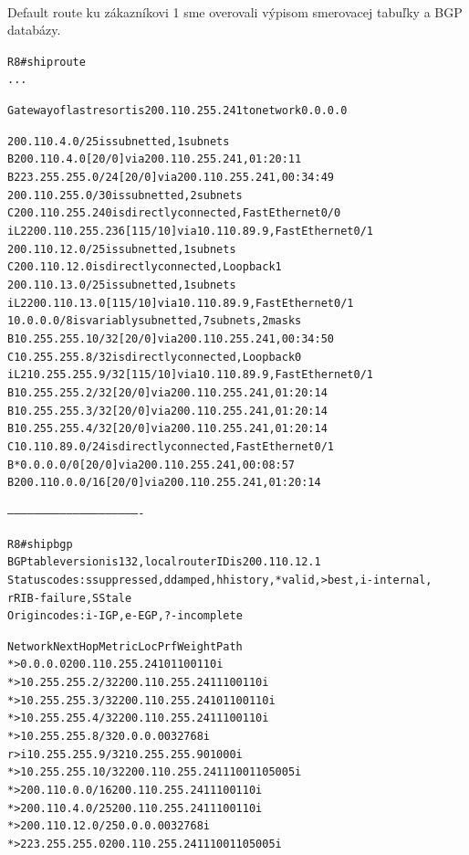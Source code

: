 \documentclass[12pt,twoside,a4paper]{report}
\begin{document}
\paragraph{}
Default route ku zákazníkovi 1 sme overovali výpisom smerovacej tabuľky a BGP databázy.

\noindent
{\selectfont
\begin{small}
\begin{alltt}
R8#sh ip route
...

Gateway of last resort is 200.110.255.241 to network 0.0.0.0

     200.110.4.0/25 is subnetted, 1 subnets
B       200.110.4.0 [20/0] via 200.110.255.241, 01:20:11
B    223.255.255.0/24 [20/0] via 200.110.255.241, 00:34:49
     200.110.255.0/30 is subnetted, 2 subnets
C       200.110.255.240 is directly connected, FastEthernet0/0
i L2    200.110.255.236 [115/10] via 10.110.89.9, FastEthernet0/1
     200.110.12.0/25 is subnetted, 1 subnets
C       200.110.12.0 is directly connected, Loopback1
     200.110.13.0/25 is subnetted, 1 subnets
i L2    200.110.13.0 [115/10] via 10.110.89.9, FastEthernet0/1
     10.0.0.0/8 is variably subnetted, 7 subnets, 2 masks
B       10.255.255.10/32 [20/0] via 200.110.255.241, 00:34:50
C       10.255.255.8/32 is directly connected, Loopback0
i L2    10.255.255.9/32 [115/10] via 10.110.89.9, FastEthernet0/1
B       10.255.255.2/32 [20/0] via 200.110.255.241, 01:20:14
B       10.255.255.3/32 [20/0] via 200.110.255.241, 01:20:14
B       10.255.255.4/32 [20/0] via 200.110.255.241, 01:20:14
C       10.110.89.0/24 is directly connected, FastEthernet0/1
B*   0.0.0.0/0 [20/0] via 200.110.255.241, 00:08:57
B    200.110.0.0/16 [20/0] via 200.110.255.241, 01:20:14


-------------------------------------------------------------


R8#sh ip bgp                            
BGP table version is 132, local router ID is 200.110.12.1
Status codes: s suppressed, d damped, h history, * valid, > best, i - internal,
              r RIB-failure, S Stale
Origin codes: i - IGP, e - EGP, ? - incomplete

   Network          Next Hop            Metric LocPrf Weight Path
*> 0.0.0.0          200.110.255.241          0    110      0 110 i
*> 10.255.255.2/32  200.110.255.241               110      0 110 i
*> 10.255.255.3/32  200.110.255.241          0    110      0 110 i
*> 10.255.255.4/32  200.110.255.241               110      0 110 i
*> 10.255.255.8/32  0.0.0.0                  0         32768 i
r>i10.255.255.9/32  10.255.255.9             0    100      0 i
*> 10.255.255.10/32 200.110.255.241               110      0 110 5005 i
*> 200.110.0.0/16   200.110.255.241               110      0 110 i
*> 200.110.4.0/25   200.110.255.241               110      0 110 i
*> 200.110.12.0/25  0.0.0.0                  0         32768 i
*> 223.255.255.0    200.110.255.241               110      0 110 5005 i
\end{alltt}
\end{small}
}
\end{document}
